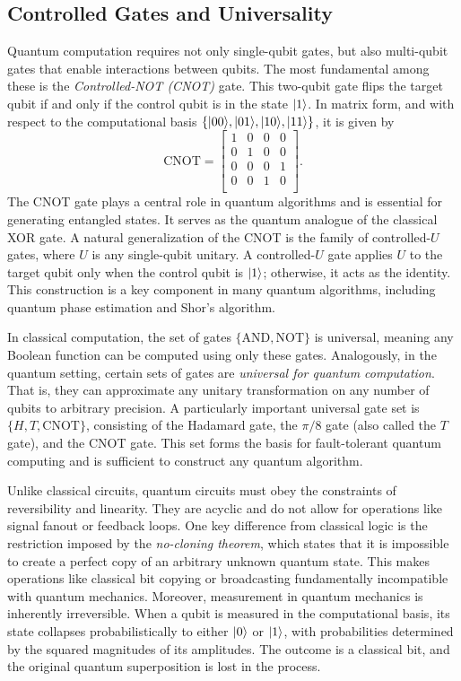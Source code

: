 \documentclass[12pt]{report}
\begin{document}
\subsection{Controlled Gates and Universality}

Quantum computation requires not only single-qubit gates, but also multi-qubit gates that enable interactions between qubits. The most fundamental among these is the \emph{Controlled-NOT (CNOT)} gate. This two-qubit gate flips the target qubit if and only if the control qubit is in the state $\lvert1\rangle$. In matrix form, and with respect to the computational basis $\{\lvert00\rangle, \lvert01\rangle, \lvert10\rangle, \lvert11\rangle\}$, it is given by
\[
\text{CNOT} = 
\begin{bmatrix}
1 & 0 & 0 & 0 \\
0 & 1 & 0 & 0 \\
0 & 0 & 0 & 1 \\
0 & 0 & 1 & 0 \\
\end{bmatrix}.
\]
The CNOT gate plays a central role in quantum algorithms and is essential for generating entangled states. It serves as the quantum analogue of the classical XOR gate. A natural generalization of the CNOT is the family of controlled-$U$ gates, where $U$ is any single-qubit unitary. A controlled-$U$ gate applies $U$ to the target qubit only when the control qubit is $\lvert1\rangle$; otherwise, it acts as the identity. This construction is a key component in many quantum algorithms, including quantum phase estimation and Shor’s algorithm.

In classical computation, the set of gates $\{\text{AND}, \text{NOT}\}$ is universal, meaning any Boolean function can be computed using only these gates. Analogously, in the quantum setting, certain sets of gates are \emph{universal for quantum computation}. That is, they can approximate any unitary transformation on any number of qubits to arbitrary precision. A particularly important universal gate set is $\{H, T, \text{CNOT}\}$, consisting of the Hadamard gate, the $\pi/8$ gate (also called the $T$ gate), and the CNOT gate. This set forms the basis for fault-tolerant quantum computing and is sufficient to construct any quantum algorithm.

Unlike classical circuits, quantum circuits must obey the constraints of reversibility and linearity. They are acyclic and do not allow for operations like signal fanout or feedback loops. One key difference from classical logic is the restriction imposed by the \emph{no-cloning theorem}, which states that it is impossible to create a perfect copy of an arbitrary unknown quantum state. This makes operations like classical bit copying or broadcasting fundamentally incompatible with quantum mechanics. Moreover, measurement in quantum mechanics is inherently irreversible. When a qubit is measured in the computational basis, its state collapses probabilistically to either $\lvert0\rangle$ or $\lvert1\rangle$, with probabilities determined by the squared magnitudes of its amplitudes. The outcome is a classical bit, and the original quantum superposition is lost in the process.
\end{document}
